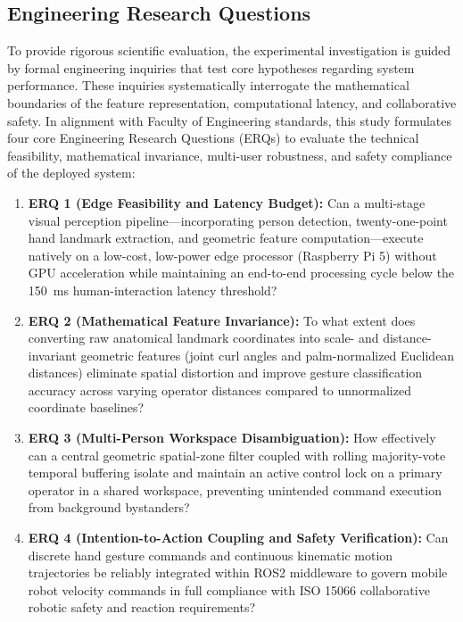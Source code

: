 \subsection{Engineering Research Questions}
To provide rigorous scientific evaluation, the experimental investigation is guided by formal engineering inquiries that test core hypotheses regarding system performance. These inquiries systematically interrogate the mathematical boundaries of the feature representation, computational latency, and collaborative safety. In alignment with Faculty of Engineering standards, this study formulates four core Engineering Research Questions (ERQs) to evaluate the technical feasibility, mathematical invariance, multi-user robustness, and safety compliance of the deployed system:
\begin{enumerate}
    \item \textbf{ERQ 1 (Edge Feasibility and Latency Budget):} Can a multi-stage visual perception pipeline—incorporating person detection, twenty-one-point hand landmark extraction, and geometric feature computation—execute natively on a low-cost, low-power edge processor (Raspberry Pi 5) without GPU acceleration while maintaining an end-to-end processing cycle below the 150~ms human-interaction latency threshold?
    \item \textbf{ERQ 2 (Mathematical Feature Invariance):} To what extent does converting raw anatomical landmark coordinates into scale- and distance-invariant geometric features (joint curl angles and palm-normalized Euclidean distances) eliminate spatial distortion and improve gesture classification accuracy across varying operator distances compared to unnormalized coordinate baselines?
    \item \textbf{ERQ 3 (Multi-Person Workspace Disambiguation):} How effectively can a central geometric spatial-zone filter coupled with rolling majority-vote temporal buffering isolate and maintain an active control lock on a primary operator in a shared workspace, preventing unintended command execution from background bystanders?
    \item \textbf{ERQ 4 (Intention-to-Action Coupling and Safety Verification):} Can discrete hand gesture commands and continuous kinematic motion trajectories be reliably integrated within ROS2 middleware to govern mobile robot velocity commands in full compliance with ISO 15066 collaborative robotic safety and reaction requirements?
\end{enumerate}

